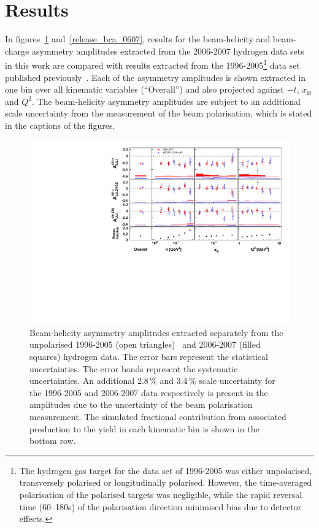 \documentclass[11pt,a4paper]{article}
\begin{document}
\section{Results}
In figures~\ref{release_bsa_0607} and~\ref{release_bca_0607}, results for the beam-helicity and beam-charge asymmetry amplitudes extracted from the 2006-2007 hydrogen data sets in this work are compared with results extracted from the 1996-2005\footnote{The hydrogen gas target for the data set of 1996-2005 was either unpolarised, transversely polarised or longitudinally polarised. However, the time-averaged polarisation of the polarised targets was negligible, while the rapid reversal time (60--180s) of the polarisation direction minimised bias due to detector effects.} data set published previously~\cite{Air09}. Each of the asymmetry amplitudes is shown extracted in one bin over all kinematic variables (``Overall'') and also projected against $-t$, $x_{\textrm{B}}$ and $Q^{2}$. The beam-helicity asymmetry amplitudes are subject to an additional scale uncertainty from the measurement of the beam polarisation, which is stated in the captions of the figures.
\begin{figure}
\begin{center}
\includegraphics[width=15cm,keepaspectratio]{bsa_sep}
  \caption{Beam-helicity asymmetry amplitudes extracted separately from
the unpolarised 1996-2005 (open triangles)~\cite{Air09} and 2006-2007 (filled squares)
hydrogen data. The error bars represent the statistical uncertainties. The error bands represent the systematic uncertainties.
An additional 2.8\,\% and 3.4\,\% scale uncertainty for the 1996-2005 and
2006-2007 data respectively is present in the amplitudes due to the uncertainty of
the beam polarisation measurement. The simulated fractional contribution from associated production to the yield in each kinematic bin is shown in the bottom row.}
 \label{release_bsa_0607}
\end{center}
 \end{figure}
\end{document}
